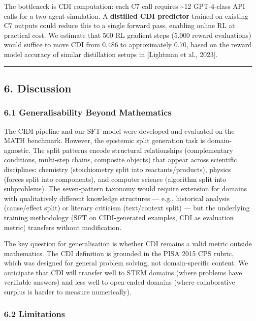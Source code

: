 \documentclass[
  11pt,
]{article}
\begin{document}
The bottleneck is CDI computation: each C7 call requires
\textasciitilde12 GPT-4-class API calls for a two-agent simulation. A
\textbf{distilled CDI predictor} trained on existing C7 outputs could
reduce this to a single forward pass, enabling online RL at practical
cost. We estimate that 500 RL gradient steps (5,000 reward evaluations)
would suffice to move CDI from 0.486 to approximately 0.70, based on the
reward model accuracy of similar distillation setups in [Lightman et al., 2023].

\begin{center}\rule{0.5\linewidth}{0.5pt}\end{center}

\subsection{6. Discussion}\label{discussion}

\subsubsection{6.1 Generalisability Beyond
Mathematics}\label{generalisability-beyond-mathematics}

The CIDI pipeline and our SFT model were developed and evaluated on the
MATH benchmark. However, the epistemic split generation task is
domain-agnostic. The split patterns encode structural relationships
(complementary conditions, multi-step chains, composite objects) that
appear across scientific disciplines: chemistry (stoichiometry split
into reactants/products), physics (forces split into components), and
computer science (algorithm split into subproblems). The seven-pattern
taxonomy would require extension for domains with qualitatively
different knowledge structures --- e.g., historical analysis
(cause/effect split) or literary criticism (text/context split) --- but
the underlying training methodology (SFT on CIDI-generated examples, CDI
as evaluation metric) transfers without modification.

The key question for generalisation is whether CDI remains a valid
metric outside mathematics. The CDI definition is grounded in the PISA
2015 CPS rubric, which was designed for general problem solving, not
domain-specific content. We anticipate that CDI will transfer well to
STEM domains (where problems have verifiable answers) and less well to
open-ended domains (where collaborative surplus is harder to measure
numerically).

\subsubsection{6.2 Limitations}\label{limitations}
\end{document}
